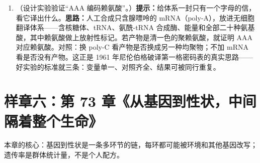 \begin{enumerate}[itemsep=3pt]
\item （设计实验验证“AAA 编码赖氨酸”。）\textbf{提示：}给体系一封只有一个字母的信，看它译出什么。\textbf{思路：}人工合成只含腺嘌呤的 mRNA（poly-A），放进无细胞翻译体系——含核糖体、tRNA、氨酰-tRNA 合成酶、能量和全部二十种氨基酸，其中赖氨酸做上放射性标记。若产物是清一色的聚赖氨酸，就证明 AAA 对应赖氨酸。对照：换 poly-C 看产物是否换成另一种均聚物；不加 mRNA 看是否没有产物。这正是 1961 年尼伦伯格破译第一格密码表的真实思路——好实验的标准就三条：变量单一、对照齐全、结果可被同行重复。
\end{enumerate}

\section{样章六：第 73 章《从基因到性状，中间隔着整个生命》}

本章的核心：基因到性状是一条多环节的链，每环都可能被环境和其他基因改写；遗传率是群体统计量，不是个人配方。

